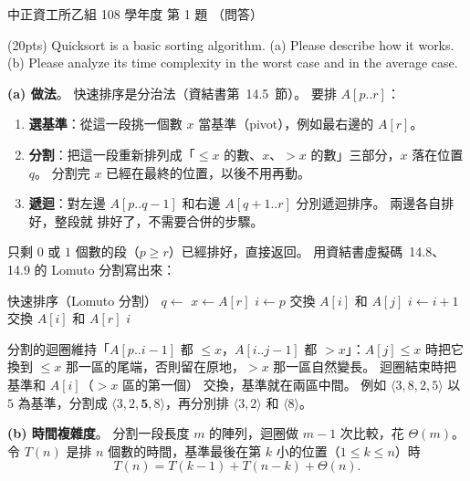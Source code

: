 \begin{pastexam}[label={px:ccu-108-csb-01}]{中正資工所乙組 108 學年度 第 1 題}
（問答）

(20pts) Quicksort is a basic sorting algorithm. (a) Please describe how it works. (b) Please
analyze its time complexity in the worst case and in the average case.
\end{pastexam}

\begin{pastsoln}
\textbf{(a) 做法}。 快速排序是分治法（資結書第~14.5~節）。 要排 $A[p..r]$：
\begin{enumerate}
\item \textbf{選基準}：從這一段挑一個數 $x$ 當基準（pivot），例如最右邊的 $A[r]$。
\item \textbf{分割}：把這一段重新排列成「$\le x$ 的數、$x$、$> x$ 的數」三部分，$x$ 落在位置
$q$。 分割完 $x$ 已經在最終的位置，以後不用再動。
\item \textbf{遞迴}：對左邊 $A[p..q-1]$ 和右邊 $A[q+1..r]$ 分別遞迴排序。 兩邊各自排好，整段就
排好了，不需要合併的步驟。
\end{enumerate}
只剩 $0$ 或 $1$ 個數的段（$p \ge r$）已經排好，直接返回。 用資結書虛擬碼~14.8、14.9 的 Lomuto
分割寫出來：

\begin{pseudo}{快速排序（Lomuto 分割）}
        \State $q \gets$ 
        \State {}
        \State {}
    \EndIf
\EndProcedure
{}
    \State $x \gets A[r]$ 
    \State $i \gets p$ 
            \State 交換 $A[i]$ 和 $A[j]$
            \State $i \gets i + 1$
        \EndIf
    \EndFor
    \State 交換 $A[i]$ 和 $A[r]$ 
    \State \Return $i$
\EndFunction
\end{pseudo}

分割的迴圈維持「$A[p..i-1]$ 都 $\le x$，$A[i..j-1]$ 都 $> x$」：$A[j] \le x$ 時把它換到 $\le x$
那一區的尾端，否則留在原地，$> x$ 那一區自然變長。 迴圈結束時把基準和 $A[i]$（$> x$ 區的第一個）
交換，基準就在兩區中間。 例如 $\langle 3, 8, 2, 5\rangle$ 以 $5$ 為基準，分割成
$\langle 3, 2, \mathbf{5}, 8\rangle$，再分別排 $\langle 3, 2\rangle$ 和 $\langle 8\rangle$。

\textbf{(b) 時間複雜度}。 分割一段長度 $m$ 的陣列，迴圈做 $m - 1$ 次比較，花 $\Theta(m)$。 令
$T(n)$ 是排 $n$ 個數的時間，基準最後在第 $k$ 小的位置（$1 \le k \le n$）時
\[
T(n) = T(k - 1) + T(n - k) + \Theta(n).
\]


\end{pastsoln}
